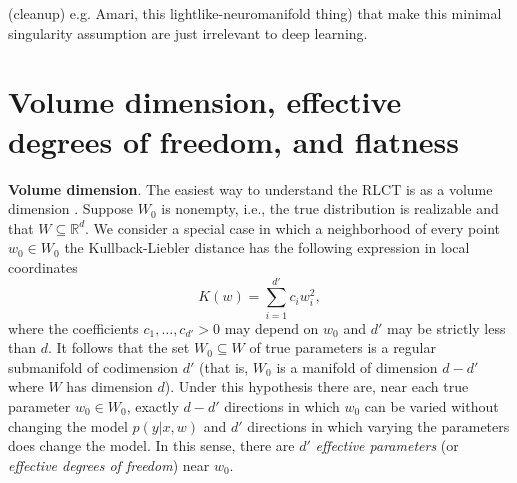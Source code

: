 \documentclass{article} %
\begin{document}
\begin{remark} (cleanup)
e.g. Amari, this lightlike-neuromanifold thing) that make this minimal singularity assumption are just irrelevant to deep learning.
\end{remark}

\section{Volume dimension, effective degrees of freedom, and flatness}
\label{section:no_flat_minima}

\textbf{Volume dimension}. The easiest way to understand the RLCT is as a volume dimension \citep[Theorem 7.1]{watanabe_algebraic_2009}.  Suppose $W_0$ is nonempty, i.e., the true distribution is realizable and that $W \subseteq \mathbb{R}^d$. We consider a special case in which a neighborhood of every point $w_0 \in W_0$ the Kullback-Liebler distance has the following expression in local coordinates
\begin{equation}\label{eq:local_Kw}
K(w) = \sum_{i=1}^{d'} c_i w_i^2,
\end{equation} %
where the coefficients $c_1,\ldots,c_{d'} > 0$ may depend on $w_0$ and $d'$ may be strictly less than $d$. It follows that the set $W_0 \subseteq W$ of true parameters is a regular submanifold of codimension $d'$ (that is, $W_0$ is a manifold of dimension $d - d'$ where $W$ has dimension $d$). Under this hypothesis there are, near each true parameter $w_0 \in W_0$, exactly $d - d'$ directions in which $w_0$ can be varied without changing the model $p(y|x,w)$ and $d'$ directions in which varying the parameters does change the model. In this sense, there are $d'$ \emph{effective parameters} (or \emph{effective degrees of freedom}) near $w_0$. 
\end{document}
